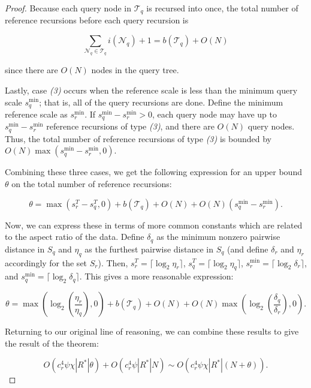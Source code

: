 \begin{proof}
Because each query node in $\mathscr{T}_q$ is recursed into once, the total
number of reference recursions before each query recursion is

\begin{equation}
\sum_{\mathscr{N}_q \in \mathscr{T}_q} i(\mathscr{N}_q) + 1 = b(\mathscr{T}_q) +
O(N)
\end{equation}

\noindent since there are $O(N)$ nodes in the query tree.

Lastly, case \textit{(3)} occurs when the reference scale is less than the
minimum query scale $s_q^{\min}$; that is, all of the query recursions are done.
Define the minimum reference scale as $s_r^{\min}$.  If $s_q^{\min} - s_r^{\min}
> 0$, each query node may have up to $s_q^{\min} - s_r^{\min}$ reference
recursions of type \textit{(3)}, and there are $O(N)$ query nodes.  Thus, the
total number of reference recursions of type \textit{(3)} is bounded by $O(N)
\max(s_q^{\min} - s_r^{\min}, 0)$.

Combining these three cases, we get the following expression for an upper bound
$\theta$ on the total number of reference recursions:

\begin{equation}
\theta = \max(s_r^T - s_q^T, 0) + b(\mathscr{T}_q) + O(N) + O(N) (s_q^{\min} -
s_r^{\min}).
\end{equation}

Now, we can express these in terms of more common constants which are related to
the aspect ratio of the data.  Define $\delta_q$ as the minimum nonzero pairwise
distance in $S_q$ and $\eta_q$ as the furthest pairwise distance in $S_q$ (and
define $\delta_r$ and $\eta_r$ accordingly for the set $S_r$).  Then, $s_r^T =
\lceil \log_2 \eta_r \rceil$, $s_q^T = \lceil \log_2 \eta_q \rceil$, $s_r^{\min}
= \lceil \log_2 \delta_r \rceil$, and $s_q^{\min} = \lceil \log_2 \delta_q
\rceil$.  This gives a more reasonable expression:

\begin{equation}
\theta = \max\left(\log_2\left(\frac{\eta_r}{\eta_q}\right), 0\right) +
b(\mathscr{T}_q) + O(N) + O(N)
\max\left(\log_2\left(\frac{\delta_q}{\delta_r}\right), 0\right).
\end{equation}

Returning to our original line of reasoning, we can combine these results to
give the result of the theorem:

\begin{equation}
O(c_r^4 \psi \chi | R^* | \theta) + O(c_r^4 \psi | R^* | N) \sim O(c_r^4 \psi
\chi |R^*| (N + \theta)).
\end{equation}
\end{proof}

